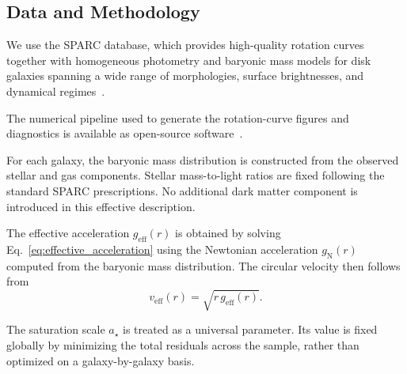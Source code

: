 \subsection{Data and Methodology}
  \label{subsec:data_method}

  We use the SPARC database, which provides high-quality rotation curves together
  with homogeneous photometry and baryonic mass models for disk galaxies spanning
  a wide range of morphologies, surface brightnesses, and dynamical regimes~\cite{Lelli2016SPARC}.

  The numerical pipeline used to generate the rotation-curve figures and diagnostics is available as open-source
  software~\cite{CosmochronySimulation}.

  For each galaxy, the baryonic mass distribution is constructed from the observed stellar and gas components.
  Stellar mass-to-light ratios are fixed following the standard SPARC prescriptions.
  No additional dark matter component is introduced in this effective description.

  The effective acceleration $g_{\mathrm{eff}}(r)$ is obtained by solving
  Eq.~\eqref{eq:effective_acceleration} using the Newtonian acceleration
  $g_{\mathrm{N}}(r)$ computed from the baryonic mass distribution.
  The circular velocity then follows from
  \begin{equation}
    v_{\mathrm{eff}}(r) = \sqrt{r\, g_{\mathrm{eff}}(r)} .
  \end{equation}

  The saturation scale $a_\star$ is treated as a universal parameter.
  Its value is fixed globally by minimizing the total residuals across the
  sample, rather than optimized on a galaxy-by-galaxy basis.
